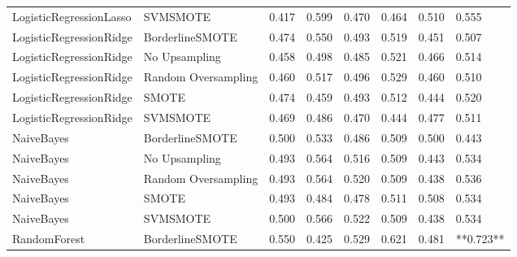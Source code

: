 \begin{tabular}{llllllll}
     LogisticRegressionLasso &            SVMSMOTE & 0.417 &                     0.599 &                 0.470 &                  0.464 &                                   0.510 &     0.555 \\
     LogisticRegressionRidge &     BorderlineSMOTE & 0.474 &                     0.550 &                 0.493 &                  0.519 &                                   0.451 &     0.507 \\
     LogisticRegressionRidge &       No Upsampling & 0.458 &                     0.498 &                 0.485 &                  0.521 &                                   0.466 &     0.514 \\
     LogisticRegressionRidge & Random Oversampling & 0.460 &                     0.517 &                 0.496 &                  0.529 &                                   0.460 &     0.510 \\
     LogisticRegressionRidge &               SMOTE & 0.474 &                     0.459 &                 0.493 &                  0.512 &                                   0.444 &     0.520 \\
     LogisticRegressionRidge &            SVMSMOTE & 0.469 &                     0.486 &                 0.470 &                  0.444 &                                   0.477 &     0.511 \\
                  NaiveBayes &     BorderlineSMOTE & 0.500 &                     0.533 &                 0.486 &                  0.509 &                                   0.500 &     0.443 \\
                  NaiveBayes &       No Upsampling & 0.493 &                     0.564 &                 0.516 &                  0.509 &                                   0.443 &     0.534 \\
                  NaiveBayes & Random Oversampling & 0.493 &                     0.564 &                 0.520 &                  0.509 &                                   0.438 &     0.536 \\
                  NaiveBayes &               SMOTE & 0.493 &                     0.484 &                 0.478 &                  0.511 &                                   0.508 &     0.534 \\
                  NaiveBayes &            SVMSMOTE & 0.500 &                     0.566 &                 0.522 &                  0.509 &                                   0.438 &     0.534 \\
                RandomForest &     BorderlineSMOTE & 0.550 &                     0.425 &                 0.529 &                  0.621 &                                   0.481 & **0.723** \\

\end{tabular}
